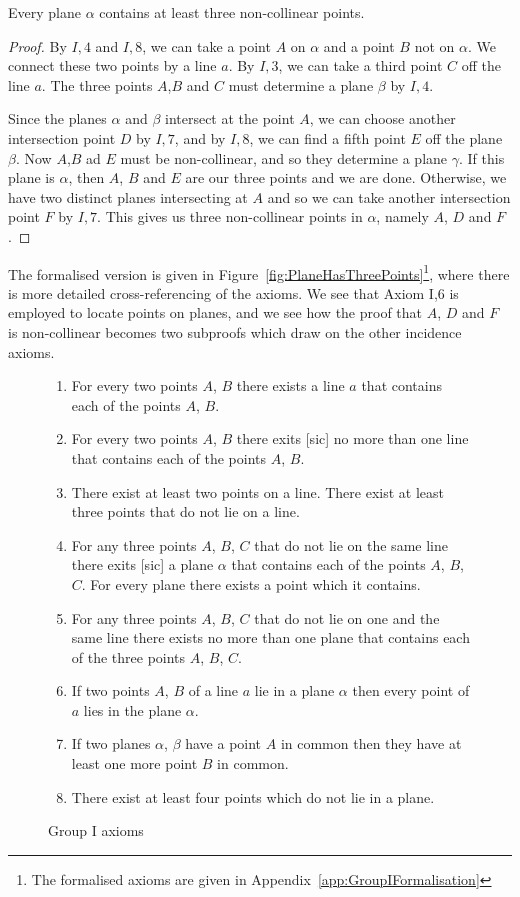 \begin{theorem}\label{theorem:PlaneHasThreePoints}
Every plane $\alpha$ contains at least three non-collinear points.
\end{theorem}
\begin{proof}
By $I,4$ and $I,8$, we can take a point $A$ on $\alpha$ and a point $B$ not on $\alpha$. We connect these two points by a line $a$. By $I,3$, we can take a third point $C$ off the line $a$. The three points $A$,$B$ and $C$ must determine a plane $\beta$ by $I,4$. 

Since the planes $\alpha$ and $\beta$ intersect at the point $A$, we can choose another intersection point $D$ by $I,7$, and by $I,8$, we can find a fifth point $E$ off the plane $\beta$. Now $A$,$B$ ad $E$ must be non-collinear, and so they determine a plane $\gamma$. If this plane is $\alpha$, then $A$, $B$ and $E$ are our three points and we are done. Otherwise, we have two distinct planes intersecting at $A$ and so we can take another intersection point $F$ by $I,7$. This gives us three non-collinear points in $\alpha$, namely $A$, $D$ and $F$.
\end{proof}

The formalised version is given in Figure~\ref{fig:PlaneHasThreePoints}\footnote{The formalised axioms are given in Appendix~\ref{app:GroupIFormalisation}}, where there is more detailed cross-referencing of the axioms. We see that Axiom I,6 is employed to locate points on planes, and we see how the proof that $A$, $D$ and $F$ is non-collinear becomes two subproofs which draw on the other incidence axioms.

\begin{figure}
  \begin{enumerate}
  \item[I,1] For every two points $A$, $B$ there exists a line $a$ that contains each of the points $A$, $B$.
  \item[I,2] For every two points $A$, $B$ there exits [sic] no more than one line that contains each of the points $A$, $B$.
  \item[I,3] There exist at least two points on a line. There exist at least three points that do not lie on a line.
  \item[I,4] For any three points $A$, $B$, $C$ that do not lie on the same line there exits [sic] a plane $\alpha$ that contains each of the points $A$, $B$, $C$. For every plane there exists a point which it contains.
  \item[I,5] For any three points $A$, $B$, $C$ that do not lie on one and the same line there exists no more than one plane that contains each of the three points $A$, $B$, $C$.
  \item[I,6] If two points $A$, $B$ of a line $a$ lie in a plane $\alpha$ then every point of $a$ lies in the plane $\alpha$.
  \item[I,7] If two planes $\alpha$, $\beta$ have a point $A$ in common then they have at least one more point $B$ in common.
  \item[I,8] There exist at least four points which do not lie in a plane.
  \end{enumerate}
  \caption{Group I axioms}
  \label{fig:GroupI}
\end{figure}

